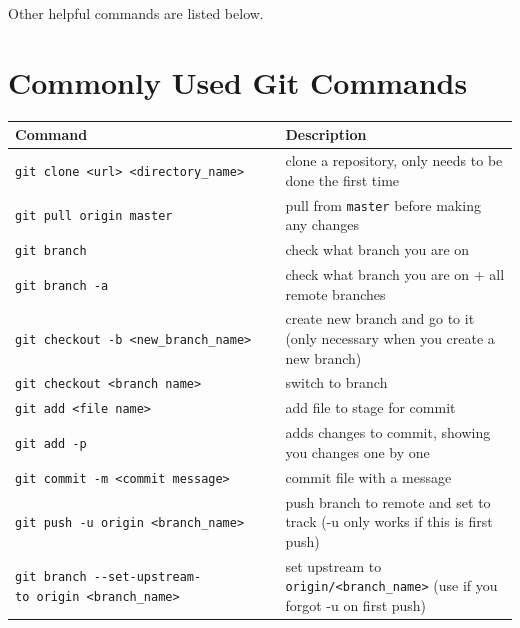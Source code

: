 \documentclass[
]{book}
\begin{document}
Other helpful commands are listed below.

\section{Commonly Used Git Commands}\label{commonly-used-git-commands}

\begin{longtable}[]{@{}
  >{\raggedright\arraybackslash}p{}
  >{\raggedright\arraybackslash}p{}@{}}
\toprule\noalign{}
\begin{minipage}[b]{\linewidth}\raggedright
Command
\end{minipage} & \begin{minipage}[b]{\linewidth}\raggedright
Description
\end{minipage} \\
\midrule\noalign{}
\endhead
\bottomrule\noalign{}
\endlastfoot
\texttt{git\ clone\ \textless{}url\textgreater{}\ \textless{}directory\_name\textgreater{}} & clone a repository, only needs to be done the first time \\
\texttt{git\ pull\ origin\ master} & pull from \texttt{master} before making any changes \\
\texttt{git\ branch} & check what branch you are on \\
\texttt{git\ branch\ -a} & check what branch you are on + all remote branches \\
\texttt{git\ checkout\ -b\ \textless{}new\_branch\_name\textgreater{}} & create new branch and go to it (only necessary when you create a new branch) \\
\texttt{git\ checkout\ \textless{}branch\ name\textgreater{}} & switch to branch \\
\texttt{git\ add\ \textless{}file\ name\textgreater{}} & add file to stage for commit \\
\texttt{git\ add\ -p} & adds changes to commit, showing you changes one by one \\
\texttt{git\ commit\ -m\ \textless{}commit\ message\textgreater{}} & commit file with a message \\
\texttt{git\ push\ -u\ origin\ \textless{}branch\_name\textgreater{}} & push branch to remote and set to track (-u only works if this is first push) \\
\texttt{git\ branch\ -\/-set-upstream-to\ origin\ \textless{}branch\_name\textgreater{}} & set upstream to \texttt{origin/\textless{}branch\_name\textgreater{}} (use if you forgot -u on first push) \\

\end{longtable}
\end{document}
